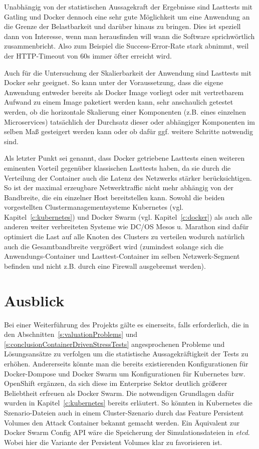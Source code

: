 Unabh\"angig von der statistischen Aussagekraft der Ergebnisse sind Lasttests mit Gatling und Docker dennoch eine sehr gute M\"oglichkeit um eine Anwendung an die Grenze der Belastbarkeit und dar\"uber hinaus zu bringen.
Dies ist speziell dann von Interesse, wenn man herausfinden will wann die Software sprichw\"ortlich \glqq{}zusammenbricht\grqq{}.
Also zum Beispiel die Success-Error-Rate stark abnimmt, weil der HTTP-Timeout von 60s immer \"ofter erreicht wird.

Auch f\"ur die Untersuchung der Skalierbarkeit der Anwendung sind Lasttests mit Docker sehr geeignet.
So kann unter der Voraussetzung, dass die eigene Anwendung entweder bereits als Docker Image vorliegt oder mit vertretbarem Aufwand zu einem Image paketiert werden kann, sehr anschaulich getestet werden, ob die horizontale Skalierung einer Komponenten (z.B. eines einzelnen Microservices) tats\"achlich der Durchsatz dieser oder abh\"angiger Komponenten im selben Ma\ss{} gesteigert werden kann oder ob daf\"ur ggf. weitere Schritte notwendig sind.

Als letzter Punkt sei genannt, dass Docker getriebene Lasttests einen weiteren eminenten Vorteil gegen\"uber klassischen Lasttests haben, da sie durch die Verteilung der Container auch die Latenz des Netzwerks st\"arker ber\"ucksichtigen.
So ist der maximal erzeugbare Netwerktraffic nicht mehr abh\"angig von der Bandbreite, die ein einzelner Host bereitstellen kann.
Sowohl die beiden vorgestellten Clustermanagementsysteme Kubernetes (vgl. Kapitel~\ref{c:kubernetes}) und Docker Swarm (vgl. Kapitel~\ref{c:docker}) als auch alle anderen weiter verbreiteten Systeme wie DC/OS Mesos u. Marathon sind daf\"ur optimiert die Last auf alle Knoten des Clusters zu verteilen wodurch nat\"urlich auch die Gesamtbandbreite vergr\"o\ss{}ert wird (zumindest solange sich die Anwendungs-Container und Lasttest-Container im selben Netzwerk-Segment befinden und nicht z.B. durch eine Firewall ausgebremst werden).

\section{Ausblick}

Bei einer Weiterf\"uhrung des Projekts g\"alte es einerseits, falls erforderlich, die in den Abschnitten~\ref{s:valuationProblems} und \ref{s:conclusionContainerDrivenStressTests} angesprochenen Probleme und L\"osungsans\"atze zu verfolgen um die statistische Aussagekr\"aftigkeit der Tests zu erh\"ohen.
Andererseits k\"onnte man die bereits existierenden Konfigurationen f\"ur Docker-Dompose und Docker Swarm um Konfigurationen f\"ur Kubernetes bzw. OpenShift erg\"anzen, da sich diese im Enterprise Sektor deutlich gr\"o\ss{}erer Beliebtheit erfreuen als Docker Swarm.
Die notwendigen Grundlagen daf\"ur wurden in Kapitel~\ref{c:kubernetes} bereits erl\"autert.
So k\"onnten in Kubernetes die Szenario-Dateien auch in einem Cluster-Szenario durch das Feature \glqq{}Persistent Volumes\grqq{} den Attack Container bekannt gemacht werden.
Ein \"Aquivalent zur Docker Swarm Config API w\"are die Speicherung der Simulationsdateien in \textit{etcd}.
Wobei hier die Variante der Persistent Volumes klar zu favorisieren ist.

